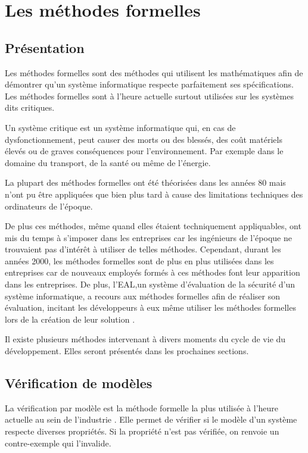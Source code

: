 \documentclass[12pt]{report}
\begin{document}
\section{Les méthodes formelles }
\subsection{Présentation}
Les méthodes formelles sont des méthodes qui utilisent les mathématiques afin de démontrer qu'un système informatique respecte parfaitement ses spécifications. Les méthodes formelles sont à l'heure actuelle surtout utilisées sur les systèmes dits critiques.

Un système critique est un système informatique qui, en cas de dysfonctionnement, peut causer des morts ou des blessés, des coût matériels élevés ou de graves conséquences pour l'environnement. Par exemple dans le domaine du transport, de la santé ou même de l'énergie.

La plupart des méthodes formelles ont été théorisées dans les années 80 mais n'ont pu être appliquées que bien plus tard à cause des limitations techniques des ordinateurs de l'époque. 

De plus ces méthodes, même quand elles étaient techniquement appliquables, ont mis du temps à s'imposer dans les entreprises car les ingénieurs de l'époque ne trouvaient pas d'intérêt à utiliser de telles méthodes. Cependant, durant les années 2000, les méthodes formelles sont de plus en plus utilisées dans les entreprises car de nouveaux employés formés à ces méthodes font leur apparition dans les entreprises. De plus, l'\gls{EAL},un système d'évaluation de la sécurité d'un système informatique, a recours aux méthodes formelles afin de réaliser son évaluation, incitant les développeurs à eux même utiliser les méthodes formelles lors de la création de leur solution \cite{griffault}.    

Il existe plusieurs méthodes intervenant à divers moments du cycle de vie du développement. Elles seront présentés dans les prochaines sections.   
\subsection{Vérification de modèles}
La vérification par modèle est la méthode formelle la plus utilisée à l'heure actuelle au sein de l'industrie \cite{griffault}. Elle permet de vérifier si le modèle d'un système respecte diverses propriétés. Si la propriété n'est pas vérifiée, on renvoie un contre-exemple qui l'invalide. 
\end{document}
